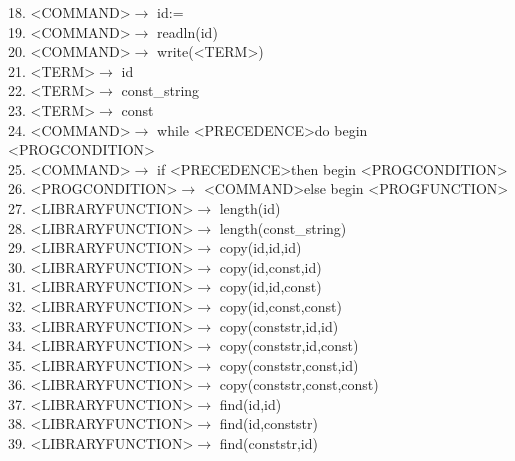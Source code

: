 \documentclass[12pt,a4paper,titlepage,final]{report}
\begin{document}
18. \textless COMMAND\textgreater  $\rightarrow$ id:= \\
19. \textless COMMAND\textgreater  $\rightarrow$ readln(id) \\
20. \textless COMMAND\textgreater  $\rightarrow$ write(\textless TERM\textgreater ) \\
21. \textless TERM\textgreater  $\rightarrow$ id \\
22. \textless TERM\textgreater  $\rightarrow$ const\_string \\
23. \textless TERM\textgreater  $\rightarrow$ const \\
24. \textless COMMAND\textgreater  $\rightarrow$ while \textless PRECEDENCE\textgreater  do begin \textless PROGCONDITION\textgreater \\
25. \textless COMMAND\textgreater  $\rightarrow$ if \textless PRECEDENCE\textgreater  then begin \textless PROGCONDITION\textgreater \\
26. \textless PROGCONDITION\textgreater  $\rightarrow$ \textless COMMAND\textgreater  else begin \textless PROGFUNCTION\textgreater \\
27. \textless LIBRARYFUNCTION\textgreater  $\rightarrow$ length(id) \\
28. \textless LIBRARYFUNCTION\textgreater  $\rightarrow$ length(const\_string) \\
29. \textless LIBRARYFUNCTION\textgreater  $\rightarrow$ copy(id,id,id) \\
30. \textless LIBRARYFUNCTION\textgreater  $\rightarrow$ copy(id,const,id) \\
31. \textless LIBRARYFUNCTION\textgreater  $\rightarrow$ copy(id,id,const) \\
32. \textless LIBRARYFUNCTION\textgreater  $\rightarrow$ copy(id,const,const) \\
33. \textless LIBRARYFUNCTION\textgreater  $\rightarrow$ copy(conststr,id,id) \\
34. \textless LIBRARYFUNCTION\textgreater  $\rightarrow$ copy(conststr,id,const) \\
35. \textless LIBRARYFUNCTION\textgreater  $\rightarrow$ copy(conststr,const,id) \\
36. \textless LIBRARYFUNCTION\textgreater  $\rightarrow$ copy(conststr,const,const) \\
37. \textless LIBRARYFUNCTION\textgreater  $\rightarrow$ find(id,id) \\
38. \textless LIBRARYFUNCTION\textgreater  $\rightarrow$ find(id,conststr) \\
39. \textless LIBRARYFUNCTION\textgreater  $\rightarrow$ find(conststr,id) \\
\end{document}
